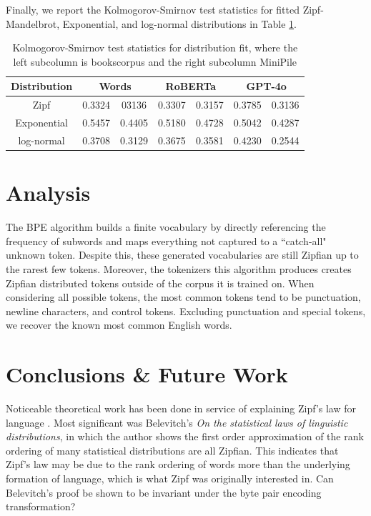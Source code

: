 \documentclass[11pt]{article}
\begin{document}
Finally, we report the Kolmogorov-Smirnov test statistics for fitted Zipf-Mandelbrot, Exponential, and log-normal distributions in Table \ref{tbl:kstest}. 

\begin{table}
    \centering
    \begin{tabular}{|c|c|c|c|c|c|c|}
        \hline
        \textbf{Distribution} & \multicolumn{2}{c|}{\textbf{Words}} & \multicolumn{2}{c|}{\textbf{RoBERTa}} & \multicolumn{2}{c|}{\textbf{GPT-4o}}  \\
        \hline
        Zipf & 0.3324 & 03136 & 0.3307 & 0.3157 & 0.3785 & 0.3136 \\
        \hline
        Exponential & 0.5457 & 0.4405 & 0.5180 & 0.4728 & 0.5042 & 0.4287 \\
        \hline
        log-normal & 0.3708 & 0.3129 & 0.3675 & 0.3581 & 0.4230 & 0.2544 \\
        \hline
    \end{tabular}
    \caption{Kolmogorov-Smirnov test statistics for distribution fit, where the left subcolumn is bookscorpus and the right subcolumn MiniPile}
    \label{tbl:kstest}
\end{table}


\section{Analysis}

The BPE algorithm builds a finite vocabulary by directly referencing the frequency of subwords and maps everything not captured to a ``catch-all" unknown token. Despite this, these generated vocabularies are still Zipfian up to the rarest few tokens. Moreover, the tokenizers this algorithm produces creates Zipfian distributed tokens outside of the corpus it is trained on. When considering all possible tokens, the most common tokens tend to be punctuation, newline characters, and control tokens. Excluding punctuation and special tokens, we recover the known most common English words. 

\section{Conclusions \& Future Work}

Noticeable theoretical work has been done in service of explaining Zipf's law for language \cite{li1992}. Most significant was Belevitch's \textit{On the statistical laws of linguistic distributions}\cite{Belevitch1959}, in which the author shows the first order approximation of the rank ordering of many statistical distributions are all Zipfian. This indicates that Zipf's law may be due to the rank ordering of words more than the underlying formation of language, which is what Zipf was originally interested in. Can Belevitch's proof be shown to be invariant under the byte pair encoding transformation?

%




\end{document}
